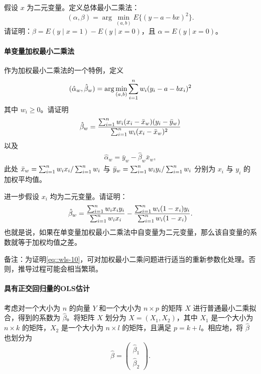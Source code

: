 假设 $x$ 为二元变量。定义总体最小二乘法：
$$
(\alpha, \beta)  = \arg\min_{(a,b)} E \{  (y - a - bx)^2 \} .
$$
请证明：$\beta = E(y\mid x=1) - E(y\mid x=0)$，且 $\alpha = E(y\mid x=0)$。 


\paragraph{单变量加权最小二乘法}\label{hw::wls-uni-binary}

作为加权最小二乘法的一个特例，定义
$$
(\hat \alpha_w, \hat \beta_w  ) = \arg\min_{(a,b)} \sum_{i=1}^n w_i(y_i - a - b x_i)^2
$$
其中 $w_i\geq 0$。请证明
\begin{eqnarray}\label{eq::wls-beta}
 \hat \beta_w  = \frac{  \sum_{i=1}^n w_i (x_i -  \bar{x}_w) (y_i - \bar{y}_w) }{  \sum_{i=1}^n w_i (x_i - \bar{x}_w)^2 }
\end{eqnarray}
以及
\begin{eqnarray}\label{eq::wls-alpha}
\hat \alpha_w = \bar{y}_w -  \hat \beta_w \bar{x}_w,
\end{eqnarray}
此处 $ \bar{x}_w =  \sum_{i=1}^n w_i  x_i / \sum_{i=1}^n w_i $ 与 $ \bar{y}_w =  \sum_{i=1}^n w_i  y_i / \sum_{i=1}^n w_i $ 分别为 $x_i$ 与 $y_i$ 的加权平均值。 



进一步假设 $x_i$ 均为二元变量。请证明：  
\begin{eqnarray}\label{eq::wls-10}
\hat \beta_w  = \frac{ \sum_{i=1}^n  w_i  x_i  y_i  }{ \sum_{i=1}^n w_i  x_i  } - \frac{ \sum_{i=1}^n w_i  (1-x_i)  y_i  }{ \sum_{i=1}^n w_i  (1-x_i)  }.
\end{eqnarray}  
也就是说，如果在单变量加权最小二乘法中自变量为二元变量，那么该自变量的系数就等于加权均值之差。 


备注：为证明\eqref{eq::wls-10}，可对加权最小二乘问题进行适当的重新参数化处理。否则，推导过程可能会相当繁琐。 




\paragraph{具有正交回归量的OLS估计}\label{hw::ols-orthogonal}


考虑对一个大小为 $n$ 的向量 $Y$ 和一个大小为 $n\times p$ 的矩阵 $X $ 进行普通最小二乘拟合，得到的系数为 $\hat{\beta}$。将矩阵 $X$ 划分为 $X = (X_1, X_2)$，其中 $X_1$ 是一个大小为 $n\times k$ 的矩阵，$X_2$ 是一个大小为 $n\times l$ 的矩阵，且满足 $p=k+l$。相应地，将 $\hat{\beta}$ 也划分为
$$
\hat{\beta} = \begin{pmatrix}
\hat{\beta}_1\\
\hat{\beta}_2
\end{pmatrix} . 
$$


